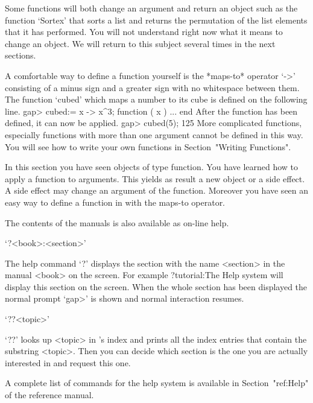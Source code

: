 Some functions will both change an argument  and return an object such as
the function `Sortex'  that sorts a  list and returns the permutation  of
the list  elements that it has  performed.  You will not understand right
now what it means  to change an object.   We will return to this  subject
several times in the next sections.

%
A comfortable way to define a function yourself is the *maps-to* operator
`->' consisting of  a minus sign and a   greater sign with  no whitespace
between them. The function  `cubed' which maps a  number  to its  cube is
defined on the following line.
\beginexample
gap> cubed:= x -> x^3;
function ( x ) ... end 
\endexample
After the function has been defined, it can now be applied.
\beginexample
gap> cubed(5);
125 
\endexample
More complicated  functions,  especially  functions with   more  than one
argument cannot be defined in this way.
You will see how to write your own {\GAP} functions in
Section~"Writing Functions".

In  this section you have seen {\GAP} objects of type function.  You have
learned how to apply a function to  arguments.  This  yields as result  a
new object or a side effect.  A side effect may change an argument of the
function.   Moreover you have seen an easy  way  to define a  function in
{\GAP} with the maps-to operator.


The contents of the {\GAP} manuals is also available as on-line help.

`?<book>:<section>'

The help command `?' displays the section  with the name <section> in the
manual <book> on the screen.  For example
\begintt
?tutorial:The Help system
\endtt
will display this section on the screen.  When the whole section has been
displayed  the normal {\GAP}  prompt  `gap>' is  shown and normal  {\GAP}
interaction resumes.

`??<topic>'

`??' looks up <topic> in {\GAP}'s index and prints  all the index entries
that contain the substring <topic>.  Then you can decide which section is
the one you are actually interested in and request this one.

A complete list of commands for the help system is available in
Section~"ref:Help" of the reference manual.

